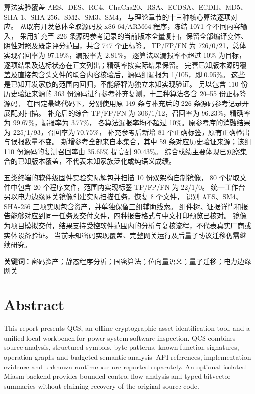 \documentclass[UTF8,a4paper,11pt,titlepage,oneside]{ctexbook}
\begin{document}
算法实验覆盖 AES、DES、RC4、ChaCha20、RSA、ECDSA、ECDH、MD5、SHA-1、SHA-256、SM2、SM3、SM4，
与理论章节的十三种核心算法逐项对应。
从既有开发总体全取源码及 x86-64/ARM64 程序，冻结 1071 个不同内容输入，
采用扩充至 226 条源码参考记录的当前版本全量复扫，保留全部编译变体、阴性对照及既定评分范围，共含 747 个正标签。
TP/FP/FN 为 726/0/21，总体实现召回率为 97.19\%，漏报率为 2.81\%。
逐算法以漏报率不超过 10\% 为目标，逐项结果及达标状态在正文列出；精确率按实际结果保留。
完善已知版本源码覆盖及直接包含头文件的联合内容核验后，源码组漏报为 1/105，即 0.95\%。
这些是已知开发家族的范围内回归，不能解释为独立未知实现验证。
另以包含 110 份历史验证来源的 363 份源码进行参考补充复测，十三种算法各含 20--55 份正标签源码，
在固定最终代码下，分别使用原 149 条与补充后的 226 条源码参考记录开展配对扫描。
补充后的综合 TP/FP/FN 为 306/1/12，召回率为 96.23\%，精确率为 99.67\%，漏报率为 3.77\%，
各算法漏报率均不超过 10\%。原参考库的消融结果为 225/1/93，召回率为 70.75\%，
补充参考后新增 81 个正确标签，原有正确检出与误报数量不变。
新增参考全部来自本集合，其中 59 条对应历史验证来源；该组 110 份源码的复测召回率由 35.65\% 提高到 90.43\%。
综合成绩主要体现已观察集合的已知版本覆盖，不代表未知家族泛化或纯语义成绩。

五类终端的软件级固件实验实际解包并扫描 10 份双架构自制镜像，
80 个提取文件中包含 20 个程序文件，范围内实现标签 TP/FP/FN 为 22/1/0。
统一工作台另以电力边缘网关镜像创建实际扫描任务，恢复 8 个文件，
识别 AES、SM4、SHA-256 三项实现包含资产，并单独保留三组辅助线索。
组件树、证据详情和报告能够对应到同一任务及交付文件，四种报告格式与中文打印预览已核对。
镜像为项目模拟交付，结果支持受控软件范围内的分析与复核流程，不代表真实厂商或实体设备验证。
当前未知密码实现覆盖、完整网关运行及后量子协议迁移仍需继续研究。

\noindent\textbf{关键词：}密码资产；静态程序分析；国密算法；位向量语义；量子迁移；电力边缘网关
\chapter*{Abstract}
This report presents QCS, an offline cryptographic asset identification tool,
and a unified local workbench for power-system software inspection.
QCS combines source analysis, structured symbols, byte patterns, known-function
signatures, operation graphs and budgeted semantic analysis. API references,
implementation evidence and unknown runtime use are reported separately.
An optional isolated Miasm backend provides bounded control-flow analysis and
typed bitvector summaries without claiming recovery of the original source code.
\end{document}
